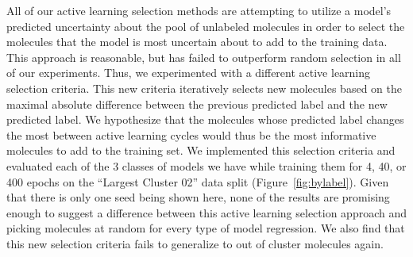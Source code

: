 \documentclass[journal=jmcmar,manuscript=article]{achemso}
\begin{document}
All of our active learning selection methods are attempting to utilize a model's predicted uncertainty about the pool of unlabeled molecules in order to select the molecules that the model is most uncertain about to add to the training data. This approach is reasonable, but has failed to outperform random selection in all of our experiments. Thus, we experimented with a different active learning selection criteria. This new criteria iteratively selects new molecules based on the maximal absolute difference between the previous predicted label and the new predicted label. We hypothesize that the molecules whose predicted label changes the most between active learning cycles would thus be the most informative molecules to add to the training set. We implemented this selection criteria and evaluated each of the 3 classes of models we have while training them for 4, 40, or 400 epochs on the ``Largest Cluster 02'' data split (Figure~\ref{fig:bylabel}). Given that there is only one  seed being shown here, none of the results are promising enough to suggest a difference between this active learning selection approach and picking molecules at random for every type of model regression. We also find that this new selection criteria fails to generalize to out of cluster molecules again.
\end{document}
